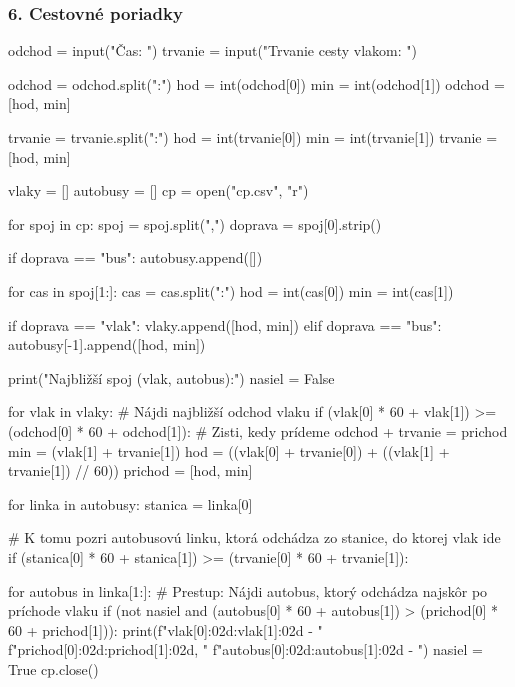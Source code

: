 \subsubsection*{6. Cestovné poriadky}
\begin{solution}
odchod = input("Čas: ")
trvanie = input("Trvanie cesty vlakom: ")

odchod = odchod.split(":")
hod = int(odchod[0])
min = int(odchod[1])
odchod = [hod, min]

trvanie = trvanie.split(":")
hod = int(trvanie[0])
min = int(trvanie[1])
trvanie = [hod, min]

vlaky = []
autobusy = []
cp = open("cp.csv", "r")

for spoj in cp:
    spoj = spoj.split(",")
    doprava = spoj[0].strip()

    if doprava == "bus":
        autobusy.append([])

    for cas in spoj[1:]:
        cas = cas.split(":")
        hod = int(cas[0])
        min = int(cas[1])

        if doprava == "vlak":
            vlaky.append([hod, min])
        elif doprava == "bus":
            autobusy[-1].append([hod, min])

print("Najbližší spoj (vlak, autobus):")
nasiel = False

for vlak in vlaky:
    # Nájdi najbližší odchod vlaku
    if (vlak[0] * 60 + vlak[1]) >= (odchod[0] * 60 + odchod[1]):
        # Zisti, kedy prídeme odchod + trvanie = prichod
        min = (vlak[1] + trvanie[1]) %
        hod = ((vlak[0] + trvanie[0]) + ((vlak[1] + trvanie[1]) // 60)) %
        prichod = [hod, min]

        for linka in autobusy:
            stanica = linka[0]

            # K tomu pozri autobusovú linku, ktorá odchádza zo stanice, do ktorej vlak ide
            if (stanica[0] * 60 + stanica[1]) >= (trvanie[0] * 60 + trvanie[1]):

                for autobus in linka[1:]:
                    # Prestup: Nájdi autobus, ktorý odchádza najskôr po príchode vlaku
                    if (not nasiel and (autobus[0] * 60 + autobus[1]) > (prichod[0] * 60 + prichod[1])):
                        print(f"{vlak[0]:02d}:{vlak[1]:02d} - "
                              f"{prichod[0]:02d}:{prichod[1]:02d}, "
                              f"{autobus[0]:02d}:{autobus[1]:02d} - ")
                        nasiel = True
cp.close()
\end{solution}